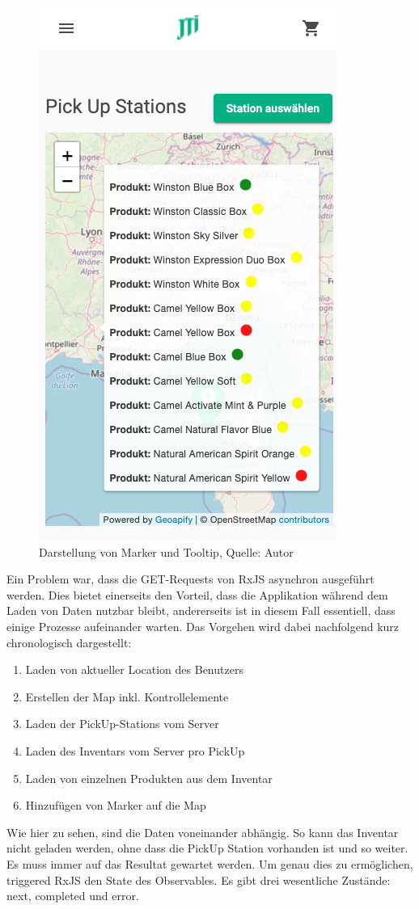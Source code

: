  \begin{figure}[H]
 	\centering
 	\includegraphics[scale=0.5]{images/tooltipCard.PNG}
 	\caption[Darstellung von Marker und Tooltip]{Darstellung von Marker und Tooltip, Quelle: Autor}
 	\label{img: tooltipCard}
 \end{figure} 
 
 Ein Problem war, dass die GET-Requests von \gls{RxJS} asynchron ausgeführt werden. Dies bietet einerseits den Vorteil, dass die Applikation während dem Laden von Daten nutzbar bleibt, andererseits ist in diesem Fall essentiell, dass einige Prozesse aufeinander warten. Das Vorgehen wird dabei nachfolgend kurz chronologisch dargestellt: 
 \begin{enumerate}
 	\item Laden von aktueller Location des Benutzers
 	\item Erstellen der Map inkl. Kontrollelemente
 	\item Laden der PickUp-Stations vom Server
 	\item Laden des Inventars vom Server pro PickUp
 	\item Laden von einzelnen Produkten aus dem Inventar
 	\item Hinzufügen von Marker auf die Map 
\end{enumerate}
Wie hier zu sehen, sind die Daten voneinander abhängig. So kann das Inventar nicht geladen werden, ohne dass die PickUp Station vorhanden ist und so weiter. Es muss immer auf das Resultat gewartet werden. Um genau dies zu ermöglichen, triggered RxJS den State des Observables. Es gibt drei wesentliche Zustände: next, completed und error. 

